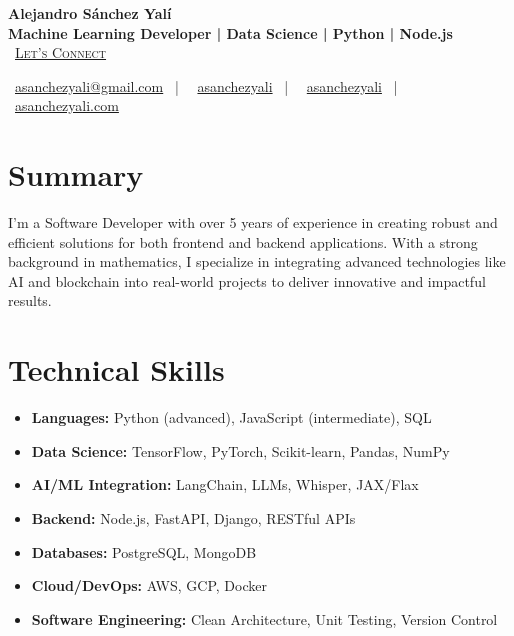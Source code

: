 \documentclass[letterpaper,11pt]{article}
\newcommand{\normalfaCalendar}{{\mdseries\faCalendar}}
\newcommand{\normalfaEnvelope}{{\mdseries\faEnvelope}}
\newcommand{\normalfaLinkedin}{{\mdseries\faLinkedin}}
\newcommand{\normalfaGithub}{{\mdseries\faGithub}}
\newcommand{\normalfaGlobe}{{\mdseries\faGlobe}}
\begin{document}
\begin{center}
\textbf{\Huge Alejandro Sánchez Yalí}\\[0.3em]
\textbf{\Large Machine Learning Developer | Data Science | Python | Node.js}\\[0.5em]
\small
\normalfaCalendar\ \href{https://cal.com/asanchezyali/full-time-opportunities}{\textsc{Let's Connect}}

\vspace{1em}
\normalfaEnvelope\ \href{mailto:asanchezyali@gmail.com}{asanchezyali@gmail.com}  ~|~
\normalfaLinkedin\ \href{https://www.linkedin.com/in/asanchezyali}{asanchezyali} ~|~
\normalfaGithub\ \href{https://github.com/asanchezyali}{asanchezyali}  ~|~
\normalfaGlobe\ \href{https://asanchezyali.com}{asanchezyali.com}
\end{center}

\section{Summary}
I'm a Software Developer with over 5 years of experience in creating robust and efficient solutions for both frontend and backend applications. With a strong background in mathematics, I specialize in integrating advanced technologies like AI and blockchain into real-world projects to deliver innovative and impactful results.

\section{Technical Skills}
\begin{itemize}[leftmargin=*]
  \item \textbf{Languages:} Python (advanced), JavaScript (intermediate), SQL
  \item \textbf{Data Science:} TensorFlow, PyTorch, Scikit-learn, Pandas, NumPy
  \item \textbf{AI/ML Integration:} LangChain, LLMs, Whisper, JAX/Flax
  \item \textbf{Backend:} Node.js, FastAPI, Django, RESTful APIs
  \item \textbf{Databases:} PostgreSQL, MongoDB
  \item \textbf{Cloud/DevOps:} AWS, GCP, Docker
  \item \textbf{Software Engineering:} Clean Architecture, Unit Testing, Version Control
\end{itemize}
\end{document}
